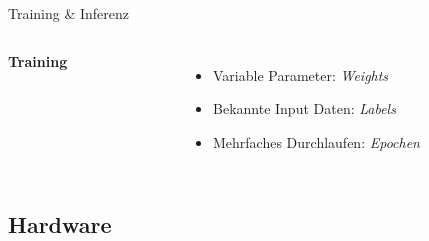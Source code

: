 \begin{frame}{Training \& Inferenz}
    \begin{columns}[T]
        \textbf{Training}
        \begin{figure}
            \centering
            \def\svgwidth{0.8\columnwidth}
            
        \end{figure}
        \begin{itemize}
            \item Variable Parameter: \textit{Weights}
            \item Bekannte Input Daten: \textit{Labels}
            \item Mehrfaches Durchlaufen: \textit{Epochen}
        \end{itemize}
    \end{columns}
\end{frame}



\subsection[\thesection .\thesubsection \ 
Hardware]{Hardware}\label{subsec:hw}


